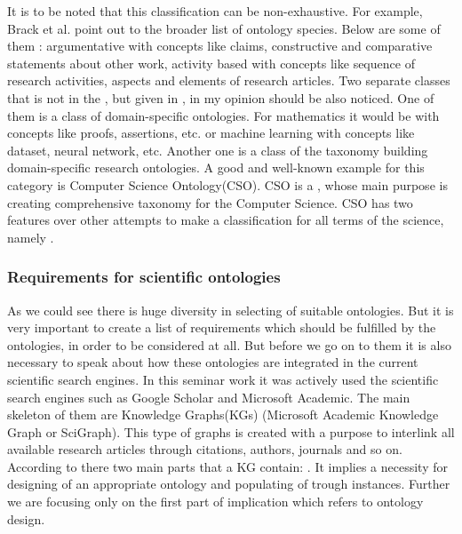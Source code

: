 		It is to be noted that this classification can be non-exhaustive. For example, Brack et al. point out to the broader list of ontology species. Below are some of them\cite{Bra20} : argumentative with concepts like claims, constructive and comparative statements about other work, activity based with concepts like sequence of research activities, aspects and elements of research articles. Two separate classes that is not in the \cite{Cor14}, but given in \cite{Bra20}, in my opinion should be also noticed. One of them is a class of domain-specific ontologies. For mathematics it would be with concepts like proofs, assertions, etc. or machine learning with concepts like dataset, neural network, etc. Another one is a class of the taxonomy building domain-specific research ontologies. A good and well-known example for this category is Computer Science Ontology(CSO). CSO is a \frqq\cite[p.1]{CSO19}, whose main purpose is creating comprehensive taxonomy for the Computer Science. CSO has two features over other attempts to make a classification for all terms of the science, namely \frqq\cite[p.1]{CSO19}.  
		
		\subsubsection{Requirements for scientific ontologies}
		As we could see there is huge diversity in selecting of suitable ontologies. But it is very important to create a list of requirements which should be fulfilled by the ontologies, in order to be considered at all. But before we go on to them it is also necessary to speak about how these ontologies are integrated in the current scientific search engines.
		In this seminar work it was actively used the scientific search engines such as Google Scholar and Microsoft Academic. The main skeleton of them are Knowledge Graphs(KGs) (Microsoft Academic Knowledge Graph or SciGraph). This type of graphs is created with a purpose to interlink all available research articles through citations, authors, journals and so on. According to \cite{Bra20} there two main parts that a KG contain: \frqq\cite{Bra20}. It implies a necessity for designing of an appropriate ontology and populating of trough instances. Further we are focusing only on the first part of implication which refers to ontology design.
		
